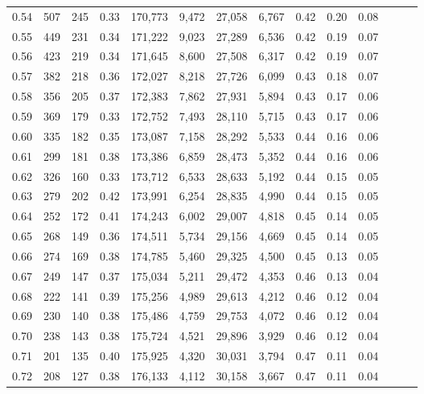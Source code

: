 \begin{tabular}{rrrrrrrrrrrrrr}
0.54 &    507 &  245 &  0.33 &  170,773 &    9,472 &  27,058 &   6,767 &  0.42 &  0.20 &      0.08 \\
0.55 &    449 &  231 &  0.34 &  171,222 &    9,023 &  27,289 &   6,536 &  0.42 &  0.19 &      0.07 \\
0.56 &    423 &  219 &  0.34 &  171,645 &    8,600 &  27,508 &   6,317 &  0.42 &  0.19 &      0.07 \\
0.57 &    382 &  218 &  0.36 &  172,027 &    8,218 &  27,726 &   6,099 &  0.43 &  0.18 &      0.07 \\
0.58 &    356 &  205 &  0.37 &  172,383 &    7,862 &  27,931 &   5,894 &  0.43 &  0.17 &      0.06 \\
0.59 &    369 &  179 &  0.33 &  172,752 &    7,493 &  28,110 &   5,715 &  0.43 &  0.17 &      0.06 \\
0.60 &    335 &  182 &  0.35 &  173,087 &    7,158 &  28,292 &   5,533 &  0.44 &  0.16 &      0.06 \\
0.61 &    299 &  181 &  0.38 &  173,386 &    6,859 &  28,473 &   5,352 &  0.44 &  0.16 &      0.06 \\
0.62 &    326 &  160 &  0.33 &  173,712 &    6,533 &  28,633 &   5,192 &  0.44 &  0.15 &      0.05 \\
0.63 &    279 &  202 &  0.42 &  173,991 &    6,254 &  28,835 &   4,990 &  0.44 &  0.15 &      0.05 \\
0.64 &    252 &  172 &  0.41 &  174,243 &    6,002 &  29,007 &   4,818 &  0.45 &  0.14 &      0.05 \\
0.65 &    268 &  149 &  0.36 &  174,511 &    5,734 &  29,156 &   4,669 &  0.45 &  0.14 &      0.05 \\
0.66 &    274 &  169 &  0.38 &  174,785 &    5,460 &  29,325 &   4,500 &  0.45 &  0.13 &      0.05 \\
0.67 &    249 &  147 &  0.37 &  175,034 &    5,211 &  29,472 &   4,353 &  0.46 &  0.13 &      0.04 \\
0.68 &    222 &  141 &  0.39 &  175,256 &    4,989 &  29,613 &   4,212 &  0.46 &  0.12 &      0.04 \\
0.69 &    230 &  140 &  0.38 &  175,486 &    4,759 &  29,753 &   4,072 &  0.46 &  0.12 &      0.04 \\
0.70 &    238 &  143 &  0.38 &  175,724 &    4,521 &  29,896 &   3,929 &  0.46 &  0.12 &      0.04 \\
0.71 &    201 &  135 &  0.40 &  175,925 &    4,320 &  30,031 &   3,794 &  0.47 &  0.11 &      0.04 \\
0.72 &    208 &  127 &  0.38 &  176,133 &    4,112 &  30,158 &   3,667 &  0.47 &  0.11 &      0.04 \\

\end{tabular}
